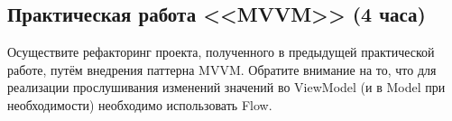 \subsection{Практическая работа <<MVVM>> (4 часа)}

Осуществите рефакторинг проекта, полученного в предыдущей практической работе, путём внедрения паттерна MVVM. Обратите внимание на то, что 
для реализации прослушивания изменений значений во ViewModel (и в Model при необходимости) необходимо использовать Flow.

